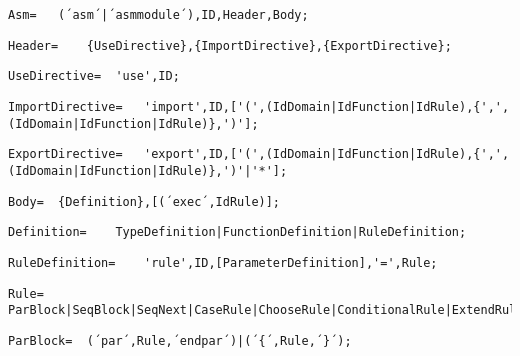 \documentclass{article}
\begin{document}
    \begin{lstlisting}[mathescape=true]
     Asm= 	(´asm´|´asmmodule´),ID,Header,Body;
    \end{lstlisting}
    
    \begin{lstlisting}[mathescape=true]
     Header= 	{UseDirective},{ImportDirective},{ExportDirective};
    \end{lstlisting}
    
    \begin{lstlisting}[mathescape=true]
     UseDirective= 	'use',ID;
    \end{lstlisting}
    
    \begin{lstlisting}[mathescape=true]
     ImportDirective= 	'import',ID,['(',(IdDomain|IdFunction|IdRule),{',',(IdDomain|IdFunction|IdRule)},')'];
    \end{lstlisting}
    
    \begin{lstlisting}[mathescape=true]
     ExportDirective= 	'export',ID,['(',(IdDomain|IdFunction|IdRule),{',',(IdDomain|IdFunction|IdRule)},')'|'*'];
    \end{lstlisting}
    
    \begin{lstlisting}[mathescape=true]
     Body= 	{Definition},[(´exec´,IdRule)];
    \end{lstlisting}
    
    \begin{lstlisting}[mathescape=true]
     Definition= 	TypeDefinition|FunctionDefinition|RuleDefinition;
    \end{lstlisting}
    
    \begin{lstlisting}[mathescape=true]
     RuleDefinition= 	'rule',ID,[ParameterDefinition],'=',Rule;
    \end{lstlisting}
    
    \begin{lstlisting}[mathescape=true]
     Rule= 	ParBlock|SeqBlock|SeqNext|CaseRule|ChooseRule|ConditionalRule|ExtendRule|ForAllRule|ImportRule|IterateRule|LetRule|TurboReturnRule|WhileRule|UpdateRule|SkipRule|CallRule|LocalRule|PrintRule;
    \end{lstlisting}
    
    \begin{lstlisting}[mathescape=true]
     ParBlock= 	(´par´,Rule,´endpar´)|(´{´,Rule,´}´);
    \end{lstlisting}
    
\end{document}
